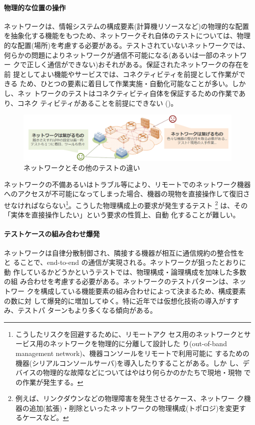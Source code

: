     \paragraph{物理的な位置の操作}
ネットワークは、情報システムの構成要素(計算機リソースなど)の物理的な配置
を抽象化する機能をもつため、ネットワークそれ自体のテストについては、物理
的な配置(場所)を考慮する必要がある。テストされていないネットワークでは、
何らかの問題によりネットワークが通信不可能になる(あるいは一部のネットワー
クで正しく通信ができない)おそれがある。保証されたネットワークの存在を前
提としてよい機能やサービスでは、コネクティビティを前提として作業ができる
ため、ひとつの要素に着目して作業実施・自動化可能なことが多い。しかし、ネッ
トワークのテストはコネクティビティ自体を保証するための作業であり、コネク
ティビティがあることを前提にできない
()。

 \begin{figure}[h]
  \centering
  \includegraphics[scale=0.45]{img/difficulty-of-network-testing.png}
  \caption{ネットワークとその他のテストの違い}
  \label{fig:difficulty-of-network-testing}
 \end{figure}

ネットワークの不備あるいはトラブル等により、リモートでのネットワーク機器
へのアクセスが不可能になってしまった場合、機器の現物を直接操作して復旧さ
せなければならない\footnote{こうしたリスクを回避するために、リモートアク
セス用のネットワークとサービス用のネットワークを物理的に分離して設計した
り(out-of-band management network)、機器コンソールをリモートで利用可能に
するための機器(シリアルコンソールサーバ)を導入したりすることがある。しか
し、デバイスの物理的な故障などについてはやはり何らかのかたちで現地・現物
での作業が発生する。}。こうした物理構成上の要求が発生するテスト
\footnote{例えば、リンクダウンなどの物理障害を発生させるケース、ネットワー
ク機器の追加(拡張)・削除といったネットワークの物理構成(トポロジ)を変更す
るケースなど。} は、その「実体を直接操作したい」という要求の性質上、自動
化することが難しい。

    \paragraph{テストケースの組み合わせ爆発}
ネットワークは自律分散制御され、隣接する機器が相互に通信規約の整合性をと
ることで、end-to-end の通信が実現される。ネットワークが狙ったとおりに動
作しているかどうかというテストでは、物理構成・論理構成を加味した多数の組
み合わせを考慮する必要がある。ネットワークのテストパターンは、ネットワー
クを構成している機能要素の組み合わせによって決まるため、構成要素の数に対
して爆発的に増加してゆく。特に近年では仮想化技術の導入がすすみ、テストパ
ターンもより多くなる傾向がある。

